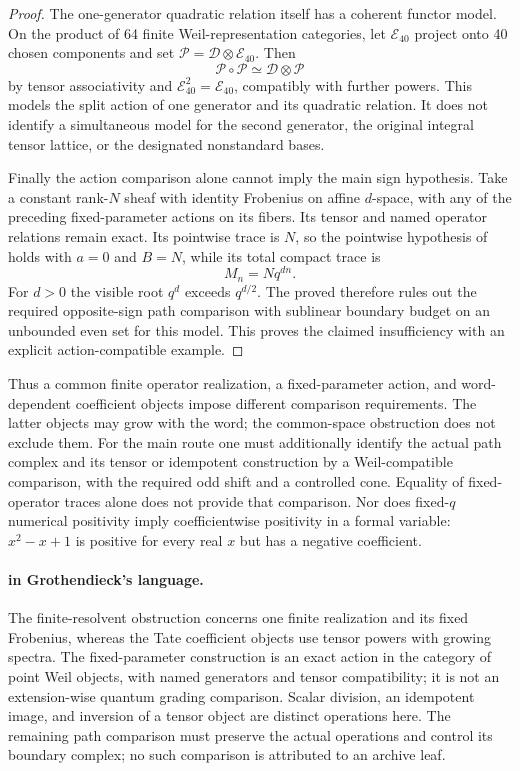\begin{proof}
The one-generator quadratic relation itself has a coherent
functor model. On the product of 64 finite Weil-representation
categories, let $\mathcal E_{40}$ project onto 40 chosen
components and set
$\mathcal P=\mathcal D\otimes\mathcal E_{40}$. Then
\[
 \mathcal P\circ\mathcal P
    \simeq\mathcal D\otimes\mathcal P
\]
by tensor associativity and
$\mathcal E_{40}^2=\mathcal E_{40}$, compatibly with further
powers. This models the split action of one generator and its
quadratic relation. It does not identify a simultaneous model
for the second generator, the original integral tensor lattice,
or the designated nonstandard bases.

Finally the action comparison alone cannot imply the main
sign hypothesis. Take a constant rank-$N$ sheaf with identity
Frobenius on affine $d$-space, with any of the preceding
fixed-parameter actions on its fibers. Its tensor and named
operator relations remain exact. Its pointwise trace is $N$,
so the pointwise hypothesis of  holds with $a=0$
and $B=N$, while its total compact trace is
\[
 M_n=Nq^{dn}.
\]
For $d>0$ the visible root $q^d$ exceeds $q^{d/2}$.
The proved  therefore rules out the required
opposite-sign path comparison with sublinear boundary budget
on an unbounded even set for this model. This proves the
claimed insufficiency with an explicit action-compatible
example.
\end{proof}

Thus a common finite operator realization, a fixed-parameter
action, and word-dependent coefficient objects impose different
comparison requirements. The latter objects may grow with the
word; the common-space obstruction does not exclude them.
For the main route one must additionally identify the actual
path complex and its tensor or idempotent construction by a
Weil-compatible comparison, with the required odd shift and a
controlled cone. Equality of fixed-operator traces alone does
not provide that comparison. Nor does fixed-$q$ numerical
positivity imply coefficientwise positivity in a formal
variable: $x^2-x+1$ is positive for every real $x$ but has a
negative coefficient.

\paragraph{ in Grothendieck's language.}
The finite-resolvent obstruction concerns one finite realization
and its fixed Frobenius, whereas the Tate coefficient objects
use tensor powers with growing spectra. The fixed-parameter
construction is an exact action in the category of point Weil
objects, with named generators and tensor compatibility; it is
not an extension-wise quantum grading comparison. Scalar
division, an idempotent image, and inversion of a tensor object
are distinct operations here. The remaining path comparison
must preserve the actual operations and control its boundary
complex; no such comparison is attributed to an archive leaf.

